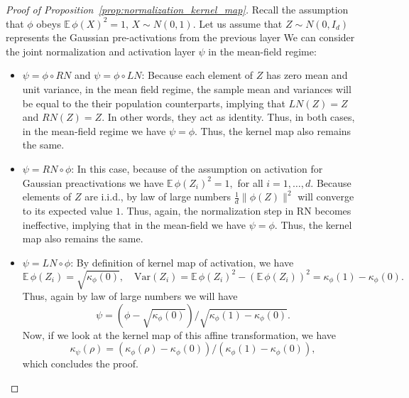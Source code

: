 \documentclass[twoside]{article}
\newcommand{\E}{\mathbb{E}\,}
\theoremstyle{definition}
\begin{document}
\begin{proof}[Proof of Proposition~\ref{prop:normalization_kernel_map}]
Recall the assumption that $\phi$ obeys $\E \phi(X)^2 = 1,\, X\sim N(0,1). $ Let us assume that $Z\sim N(0,I_d)$ represents the Gaussian pre-activations from the previous layer We can consider the joint normalization and activation layer $\psi$ in the mean-field regime: 
\begin{itemize}
    \item $\psi = \phi\circ RN$ and $\psi = \phi\circ LN$: Because each element of $Z$ has zero mean and unit variance, in the mean field regime, the sample mean and variances will be equal to the their population counterparts, implying that $LN(Z) = Z$ and $RN(Z) = Z.$ In other words, they act as identity. Thus, in both cases, in the mean-field regime we have $\psi = \phi.$ Thus, the kernel map also remains the same. 
    \item $\psi = RN \circ \phi$: In this case, because of the assumption on activation for Gaussian preactivations we have $\E \phi(Z_i)^2 = 1,$ for all $i=1,\dots, d.$ Because elements of $Z$ are i.i.d., by law of large numbers $\frac1d\|\phi(Z)\|^2$ will converge to its expected value $1.$ Thus, again, the normalization step in RN becomes ineffective, implying that in the mean-field we have $\psi = \phi.$ Thus, the kernel map also remains the same. 
    \item $\psi = LN \circ \phi$: By definition of kernel map of activation, we have  
    $$\E \phi(Z_i) = \sqrt{\kappa_\phi(0)}, \quad \mathrm{Var}(Z_i) = \E \phi(Z_i)^2 - (\E \phi(Z_i))^2 = \kappa_\phi(1) - \kappa_\phi(0).$$ 
    Thus, again by law of large numbers we will have 
    $$\psi = (\phi - \sqrt{\kappa_\phi(0)})/\sqrt{\kappa_\phi(1) - \kappa_\phi(0)}.$$ Now, if we look at the kernel map of this affine transformation, we have $$\kappa_\psi(\rho) = (\kappa_\phi(\rho) - \kappa_\phi(0))/(\kappa_\phi(1)-\kappa_\phi(0)),$$
    which concludes the proof. 
\end{itemize}


\end{proof}
\end{document}
